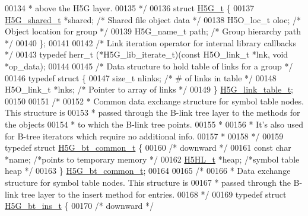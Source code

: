 \begin{DoxyCode}
00134 \textcolor{comment}{ * above the H5G layer.}
00135 \textcolor{comment}{ */}
00136 \textcolor{keyword}{struct }\hyperlink{struct_h5_g__t}{H5G\_t} \{
00137     \hyperlink{struct_h5_g__shared__t}{H5G\_shared\_t} *shared;               \textcolor{comment}{/* Shared file object data */}
00138     H5O\_loc\_t oloc;                     \textcolor{comment}{/* Object location for group */}
00139     H5G\_name\_t path;                    \textcolor{comment}{/* Group hierarchy path   */}
00140 \};
00141 
00142 \textcolor{comment}{/* Link iteration operator for internal library callbacks */}
00143 \textcolor{keyword}{typedef} herr\_t (*H5G\_lib\_iterate\_t)(\textcolor{keyword}{const} H5O\_link\_t *lnk, \textcolor{keywordtype}{void} *op\_data);
00144 
00145 \textcolor{comment}{/* Data structure to hold table of links for a group */}
00146 \textcolor{keyword}{typedef} \textcolor{keyword}{struct }\{
00147     \textcolor{keywordtype}{size\_t}      nlinks;         \textcolor{comment}{/* # of links in table */}
00148     H5O\_link\_t *lnks;           \textcolor{comment}{/* Pointer to array of links */}
00149 \} \hyperlink{struct_h5_g__link__table__t}{H5G\_link\_table\_t};
00150 
00151 \textcolor{comment}{/*}
00152 \textcolor{comment}{ * Common data exchange structure for symbol table nodes.  This structure is}
00153 \textcolor{comment}{ * passed through the B-link tree layer to the methods for the objects}
00154 \textcolor{comment}{ * to which the B-link tree points.}
00155 \textcolor{comment}{ *}
00156 \textcolor{comment}{ * It's also used for B-tree iterators which require no additional info.}
00157 \textcolor{comment}{ *}
00158 \textcolor{comment}{ */}
00159 \textcolor{keyword}{typedef} \textcolor{keyword}{struct }\hyperlink{struct_h5_g__bt__common__t}{H5G\_bt\_common\_t} \{
00160     \textcolor{comment}{/* downward */}
00161     \textcolor{keyword}{const} \textcolor{keywordtype}{char}  *name;                  \textcolor{comment}{/*points to temporary memory         */}
00162     \hyperlink{struct_h5_h_l__t}{H5HL\_t} *heap;                       \textcolor{comment}{/*symbol table heap            */}
00163 \} \hyperlink{struct_h5_g__bt__common__t}{H5G\_bt\_common\_t};
00164 
00165 \textcolor{comment}{/*}
00166 \textcolor{comment}{ * Data exchange structure for symbol table nodes.  This structure is}
00167 \textcolor{comment}{ * passed through the B-link tree layer to the insert method for entries.}
00168 \textcolor{comment}{ */}
00169 \textcolor{keyword}{typedef} \textcolor{keyword}{struct }\hyperlink{struct_h5_g__bt__ins__t}{H5G\_bt\_ins\_t} \{
00170     \textcolor{comment}{/* downward */}

\end{DoxyCode}
